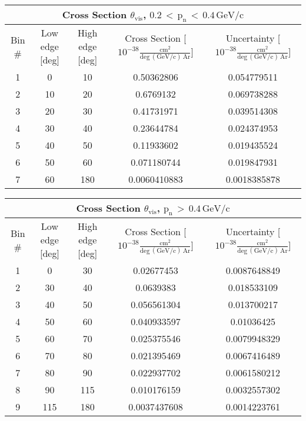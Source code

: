 \begin{table}[H]
\raggedright
\begin{adjustbox}{width=\textwidth}
\small
\begin{tabular}{ |c|c|c|c|c| }
\hline
\multicolumn{5}{|c|}{Cross Section $\theta_{\mathrm{vis}}$, $\mathrm{0.2\,<\,p_{n}\,<\,0.4\,GeV/c}$} \\
\hline
\hline
Bin \# & Low edge [deg] & High edge [deg] & Cross Section [$10^{-38}\mathrm{\frac{cm^{2}}{deg\,(GeV/c)\,Ar}}$] & Uncertainty [$10^{-38}\mathrm{\frac{cm^{2}}{deg\,(GeV/c)\,Ar}}$] \\
\hline
\hline
1 & 0 & 10 & 0.50362806 & 0.054779511\\
2 & 10 & 20 & 0.6769132 & 0.069738288\\
3 & 20 & 30 & 0.41731971 & 0.039514308\\
4 & 30 & 40 & 0.23644784 & 0.024374953\\
5 & 40 & 50 & 0.11933602 & 0.019435524\\
6 & 50 & 60 & 0.071180744 & 0.019847931\\
7 & 60 & 180 & 0.0060410883 & 0.0018385878\\
\hline
\end{tabular}
\end{adjustbox}
\end{table}


\begin{table}[H]
\raggedright
\begin{adjustbox}{width=\textwidth}
\small
\begin{tabular}{ |c|c|c|c|c| }
\hline
\multicolumn{5}{|c|}{Cross Section $\theta_{\mathrm{vis}}$, $\mathrm{p_{n}\,>\,0.4\,GeV/c}$} \\
\hline
\hline
Bin \# & Low edge [deg] & High edge [deg] & Cross Section [$10^{-38}\mathrm{\frac{cm^{2}}{deg\,(GeV/c)\,Ar}}$] & Uncertainty [$10^{-38}\mathrm{\frac{cm^{2}}{deg\,(GeV/c)\,Ar}}$] \\
\hline
\hline
1 & 0 & 30 & 0.02677453 & 0.0087648849\\
2 & 30 & 40 & 0.0639383 & 0.018533109\\
3 & 40 & 50 & 0.056561304 & 0.013700217\\
4 & 50 & 60 & 0.040933597 & 0.01036425\\
5 & 60 & 70 & 0.025375546 & 0.0079948329\\
6 & 70 & 80 & 0.021395469 & 0.0067416489\\
7 & 80 & 90 & 0.022937702 & 0.0061580212\\
8 & 90 & 115 & 0.010176159 & 0.0032557302\\
9 & 115 & 180 & 0.0037437608 & 0.0014223761\\
\hline
\end{tabular}
\end{adjustbox}
\end{table}


